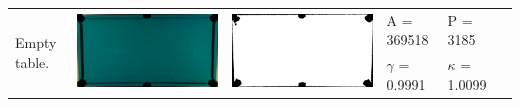 \begin{tabular}{|l|c|c|l|l|c|}
\multirow{2}{*}{Empty table.} & \multirow{2}{*}{\includegraphics[scale=0.05]{../images/1/0_img.png}} & \multirow{2}{*}{\includegraphics[scale=0.05]{../images/1/0_mask.png}} & A = 369518 & P = 3185 & \multirow{2}{*}{}\\  
& & & $\gamma$ = 0.9991 & $\kappa$ = 1.0099 & \\
\hline


\end{tabular}
